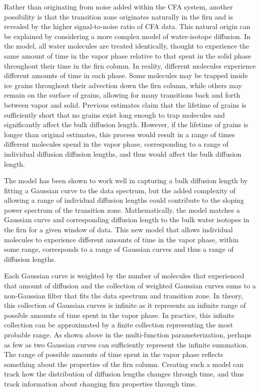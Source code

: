 \documentclass[draft, jgrga]{AGUTeX}
\begin{document}
\begin{article}
Rather than originating from noise added within the CFA system, another possibility is that the transition zone originates naturally in the firn and is revealed by the higher signal-to-noise ratio of CFA data. This natural origin can be explained by considering a more complex model of water-isotope diffusion. In the \citet{Johnsen2000} model, all water molecules are treated identically, thought to experience the same amount of time in the vapor phase relative to that spent in the solid phase throughout their time in the firn column. In reality, different molecules experience different amounts of time in each phase. Some molecules may be trapped inside ice grains throughout their advection down the firn column, while others may remain on the surface of grains, allowing for many transitions back and forth between vapor and solid. Previous estimates \citep{Whillans1985, Johnsen2000} claim that the lifetime of grains is sufficiently short that no grains exist long enough to trap molecules and significantly affect the bulk diffusion length. However, if the lifetime of grains is longer than original estimates, this process would result in a range of times different molecules spend in the vapor phase, corresponding to a range of individual diffusion diffusion lengths, and thus would affect the bulk diffusion length.

The \citet{Johnsen2000} model has been shown to work well in capturing a bulk diffusion length by fitting a Gaussian curve to the data spectrum, but the added complexity of allowing a range of individual diffusion lengths could contribute to the sloping power spectrum of the transition zone. Mathematically, the \citet{Johnsen2000} model matches a Gaussian curve and corresponding diffusion length to the bulk water isotopes in the firn for a given window of data. This new model that allows individual molecules to experience different amounts of time in the vapor phase, within some range, corresponds to a range of Gaussian curves and thus a range of diffusion lengths.

Each Gaussian curve is weighted by the number of molecules that experienced that amount of diffusion and the collection of weighted Gaussian curves sums to a non-Gaussian filter that fits the data spectrum and transition zone. In theory, this collection of Gaussian curves is infinite as it represents an infinite range of possible amounts of time spent in the vapor phase. In practice, this infinite collection can be approximated by a finite collection representing the most probable range. As shown above in the multi-function parameterization, perhaps as few as two Gaussian curves can sufficiently represent the infinite summation. The range of possible amounts of time spent in the vapor phase reflects something about the properties of the firn column. Creating such a model can track how the distribution of diffusion lengths changes through time, and thus track information about changing firn properties through time.


\end{article}
\end{document}
